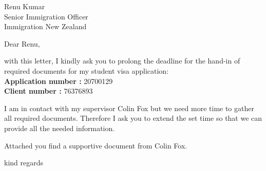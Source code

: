 \documentclass[
    sender,
    paper=a4,
    version=last,
    fontsize=11pt,
    DIV=13,
    BCOR=0mm]{scrlttr2}
\begin{document}


\begin{letter}{
    Renu Kumar \\
    Senior Immigration Officer\\
    Immigration New Zealand
}
\opening{Dear Renu,}

with this letter, I kindly ask you to prolong the deadline for the hand-in of required documents for my student visa application:\\
\textbf{Application number :} 20700129\\
\textbf{Client number :} 76376893

I am in contact with my supervisor Colin Fox but we need more time to gather all required documents.
Therefore I ask you to extend the set time so that we can provide all the needed information.

Attached you find a supportive document from Colin Fox.

\closing{kind regards} %
\end{letter}
\end{document}
